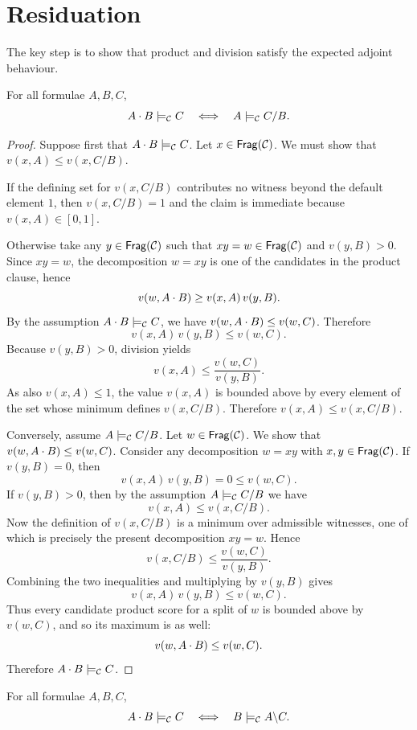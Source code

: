 \section{Residuation}
The key step is to show that product and division satisfy the expected adjoint behaviour.

\begin{proposition}
For all formulae $A,B,C$,
\[
A\mathbin{\cdot} B \models_{\mathcal C} C
\quad\Longleftrightarrow\quad
A \models_{\mathcal C} C/B.
\]
\end{proposition}

\begin{proof}
Suppose first that $A\mathbin{\cdot} B \models_{\mathcal C} C$. Let $x \in \mathsf{Frag}(\mathcal C)$. We must show that
$v(x,A) \leq v(x,C/B)$.

If the defining set for $v(x,C/B)$ contributes no witness beyond the default element $1$, then
$v(x,C/B)=1$ and the claim is immediate because $v(x,A) \in [0,1]$.

Otherwise take any $y \in \mathsf{Frag}(\mathcal C)$ such that $xy=w \in \mathsf{Frag}(\mathcal C)$ and
$v(y,B)>0$. Since $xy=w$, the decomposition $w=xy$ is one of the candidates in the product
clause, hence
\[
v(w,A\mathbin{\cdot} B) \geq v(x,A)\,v(y,B).
\]
By the assumption $A\mathbin{\cdot} B \models_{\mathcal C} C$, we have $v(w,A\mathbin{\cdot} B) \leq v(w,C)$. Therefore
\[
v(x,A)\,v(y,B) \leq v(w,C).
\]
Because $v(y,B)>0$, division yields
\[
v(x,A) \leq \frac{v(w,C)}{v(y,B)}.
\]
As also $v(x,A)\leq 1$, the value $v(x,A)$ is bounded above by every element of the set whose
minimum defines $v(x,C/B)$. Therefore $v(x,A) \leq v(x,C/B)$.

Conversely, assume $A \models_{\mathcal C} C/B$. Let $w \in \mathsf{Frag}(\mathcal C)$. We show that
$v(w,A\mathbin{\cdot} B) \leq v(w,C)$. Consider any decomposition $w=xy$ with $x,y \in \mathsf{Frag}(\mathcal C)$.
If $v(y,B)=0$, then
\[
v(x,A)\,v(y,B)=0 \leq v(w,C).
\]
If $v(y,B)>0$, then by the assumption $A \models_{\mathcal C} C/B$ we have
\[
v(x,A) \leq v(x,C/B).
\]
Now the definition of $v(x,C/B)$ is a minimum over admissible witnesses, one of which is
precisely the present decomposition $xy=w$. Hence
\[
v(x,C/B) \leq \frac{v(w,C)}{v(y,B)}.
\]
Combining the two inequalities and multiplying by $v(y,B)$ gives
\[
v(x,A)\,v(y,B) \leq v(w,C).
\]
Thus every candidate product score for a split of $w$ is bounded above by $v(w,C)$, and so
its maximum is as well:
\[
v(w,A\mathbin{\cdot} B) \leq v(w,C).
\]
Therefore $A\mathbin{\cdot} B \models_{\mathcal C} C$.
\end{proof}

\begin{proposition}
For all formulae $A,B,C$,
\[
A\mathbin{\cdot} B \models_{\mathcal C} C
\quad\Longleftrightarrow\quad
B \models_{\mathcal C} A\backslash C.
\]
\end{proposition}

